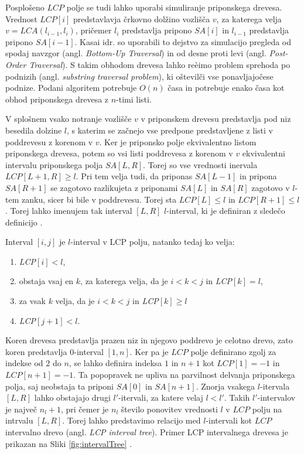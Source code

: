 Posplošeno $LCP$ polje se tudi lahko uporabi simuliranje priponskega drevesa. Vrednost $LCP[i]$ predstavlavja črkovno dolžino vozlišča $v$, za katerega velja $v=LCA(l_{i-1},l_i)$, pričemer $l_i$ predstavlja pripono $SA[i]$ in $l_{i-1}$ predstavlja pripono $SA[i-1]$. Kasai idr. \cite{Kasai2001} so uporabili to dejstvo za simulacijo pregleda od spodaj navzgor (angl. \textit{Bottom-Up Traversal}) in od desne proti levi (angl. \textit{Post-Order Traversal}). S takim obhodom drevesa lahko reèimo problem sprehoda po podnizih (angl. \textit{substring traversal problem}), ki oštevilči vse ponavljajočese podnize. Podani algoritem potrebuje $O(n)$ časa in potrebuje enako časa kot obhod priponskega drevesa z $n$-timi listi.

V splošnem vsako notranje vozlišče $v$ v priponskem drevesu predstavlja pod niz besedila dolzine $l$, s katerim se začnejo vse predpone predstavljene z listi v poddrevesu z korenom v $v$. Ker je priponsko polje ekvivalentno listom priponskega drevesa, potem so vsi listi poddrevesa z korenom v $v$ ekvivalentni intervalu priponskega polja $SA[L,R]$. Torej so vse vrednosti inervala $LCP[L+1,R]\ge l$. Pri tem velja tudi, da priponas $SA[L-1]$ in pripona $SA[R+1]$ se zagotovo razlikujeta z priponami $SA[L]$ in $SA[R]$ zagotovo v $l$-tem zanku, sicer bi bile v poddrevesu. Torej sta $LCP[L]\le l$ in $LCP[R+1]\le l$. Torej lahko imenujem tak interval $[L,R]$ $l$-interval, ki je definiran z sledečo definicijo \cite{Abouelhoda2004}.
\begin{defi}
    Interval $[i,j]$ je $l$-interval v LCP polju, natanko tedaj ko velja:
    \begin{enumerate}
        \item \textit{LCP}$[i]<l$,
        \item obstaja vsaj en $k$, za katerega velja, da je $i< k< j$ in \textit{LCP}$[k]=l$,
        \item za vsak $k$ velja, da je $i< k< j$ in \textit{LCP}$[k]\ge l$
        \item \textit{LCP}$[j+1]<l$.      
    \end{enumerate}
\end{defi}

Koren drevesa predstavlja prazen niz in njegovo poddrevo je celotno drevo, zato koren predstavlja $0$-interval $[1,n]$. Ker pa je $LCP$ polje definirano zgolj za indekse od $2$ do $n$, se lahko definira indeksa $1$ in $n+1$ kot $LCP[1]=-1$ in $LCP[n+1]=-1$. Ta popopravek ne upliva na parvilnost delvanja priponskega polja, saj neobstaja ta priponi $SA[0]$ in $SA[n+1]$. Znorja vsakega $l$-itervala $[L,R]$ lahko obstajajo drugi $l'$-itervali, za katere velaj $l<l'$. Takih $l'$-intervalov je največ $n_l+1$, pri čemer je $n_l$ število ponovitev vrednosti $l$ v $LCP$ polju na intrvalu $[L,R]$. Torej lahko predstavimo relacijo med $l$-intervali kot $LCP$ intervalno drevo (angl. \textit{LCP interval tree}). Primer LCP intervalnega drevesa je prikazan na Sliki \ref{fig:intervalTree} \cite{Abouelhoda2004}.

